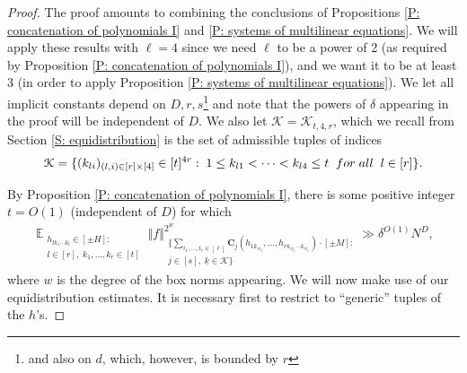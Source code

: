 \documentclass[11pt]{amsart}
\theoremstyle{definition}
\DeclareMathOperator*{\E}{\mathbb{E}}
\newcommand{\CK}{{\mathcal K}}
\newcommand{\bc}{{\mathbf{C}}}
\newcommand{\uk}{{\underline{k}}}
\newcommand{\norm}[1]{\left\Vert #1\right\Vert}
\begin{document}
\begin{proof}
The proof amounts to combining the conclusions of Propositions \ref{P: concatenation of polynomials I} and \ref{P: systems of multilinear equations}. We will apply these results with $\ell = 4$ since we need $\ell$ to be a power of 2 (as required by Proposition \ref{P: concatenation of polynomials I}), and we want it to be at least 3 (in order to apply Proposition  \ref{P: systems of multilinear equations}). We let all implicit constants depend on $D, r, s$\footnote{and also on $d$, which, however, is bounded by $r$} and note that the powers of $\delta$ appearing in the proof will be independent of $D$. We also let $\CK = \CK_{t, 4, r}$, which we recall from Section \ref{S: equidistribution} is the set of admissible tuples of indices
    \begin{align*}
        \CK = \{(k_{li})_{\substack{(l,i)\in[r]\times[4]}}\in[t]^{4r}:\; 1\leq k_{l1}<\cdots < k_{l4}\leq t\;\; \textrm{for\; all}\;\; l\in[r]\}.
    \end{align*}

By Proposition \ref{P: concatenation of polynomials I}, there is some positive integer $t=O(1)$ (independent of $D$) for which
    \begin{align}\label{E: unsmoothedconcatenated}
        \E_{\substack{h_{lk_1\cdots k_l}\in[\pm H]:\\ l\in[r],\; k_1, \ldots, k_r\in[t]}}
        \norm{f}_{\substack{\{\sum\limits_{i_1, \ldots, i_r\in[\ell]}\bc_j(h_{1k_{1i_1}}, \ldots, h_{rk_{1i_1}\cdots k_{ri_r}})\cdot[\pm M]:\\ j\in[s],\;
        \uk\in\CK\}}}^{2^{w}} \gg \delta^{O(1)} N^D,
    \end{align}
    where $w$ is the degree of the box norms appearing.  We will now make use of our equidistribution estimates.  It is necessary first to restrict to ``generic'' tuples of the $h$'s.


\end{proof}
\end{document}
